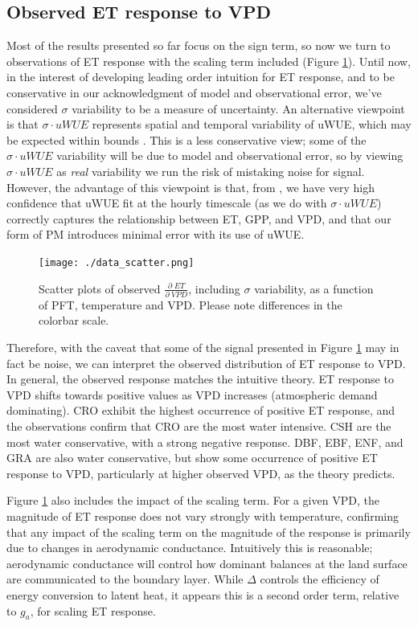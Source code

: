 \documentclass[draft,linenumbers]{agujournal}
\begin{document}
\subsection{Observed ET response to VPD}

Most of the results presented so far focus on the sign term, so now we
turn to observations of ET response with the scaling term included
(Figure \ref{data_scatter}). Until now, in the interest of developing
leading order intuition for ET response, and to be conservative in our
acknowledgment of model and observational error, we've considered
$\sigma$ variability to be a measure of uncertainty. An alternative
viewpoint is that $\sigma \cdot uWUE$ represents spatial and temporal
variability of uWUE, which may be expected within bounds \citep[see
Table \ref{pft}, also ][]{Zhou_2015}. This is a less conservative
view; some of the $\sigma \cdot uWUE$ variability will be due to model
and observational error, so by viewing $\sigma \cdot uWUE$ as
\textit{real} variability we run the risk of mistaking noise for
signal. However, the advantage of this viewpoint is that, from
\citet{Zhou_2014}, we have very high confidence that uWUE fit at the
hourly timescale (as we do with $\sigma \cdot uWUE$) correctly
captures the relationship between ET, GPP, and VPD, and that our form
of PM introduces minimal error with its use of uWUE.

\begin{figure} \centering
\centerline{\texttt{[image: ./data\_scatter.png]}}
\caption{Scatter plots of observed $\frac{\partial \; ET}{\partial \;
VPD}$, including $\sigma$ variability, as a function of PFT,
temperature and VPD. Please note differences in the colorbar scale.}
\label{data_scatter}
\end{figure}

Therefore, with the caveat that some of the signal presented in Figure
\ref{data_scatter} may in fact be noise, we can interpret the observed
distribution of ET response to VPD. In general, the observed response
matches the intuitive theory. ET response to VPD shifts towards
positive values as VPD increases (atmospheric demand dominating). CRO
exhibit the highest occurrence of positive ET response, and the
observations confirm that CRO are the most water intensive. CSH are
the most water conservative, with a strong negative response. DBF,
EBF, ENF, and GRA are also water conservative, but show some
occurrence of positive ET response to VPD, particularly at higher
observed VPD, as the theory predicts.

Figure \ref{data_scatter} also includes the impact of the scaling
term. For a given VPD, the magnitude of ET response does not vary
strongly with temperature, confirming that any impact of the scaling
term on the magnitude of the response is primarily due to changes in
aerodynamic conductance. Intuitively this is reasonable; aerodynamic
conductance will control how dominant balances at the land surface are
communicated to the boundary layer. While $\Delta$ controls the
efficiency of energy conversion to latent heat, it appears this is a
second order term, relative to $g_a$, for scaling ET response.
\end{document}
